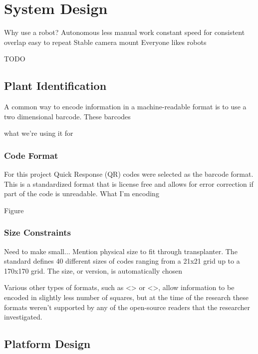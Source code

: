 
\cleardoublepage

\chapter{System Design}
\label{system}

Why use a robot?
Autonomous
less manual work 
constant speed for consistent overlap
easy to repeat
Stable camera mount
Everyone likes robots

TODO

\section{Plant Identification}
\label{system-plantid}

A common way to encode information in a machine-readable format is to use a two dimensional barcode.  These barcodes 

what we're using it for


\subsection{Code Format}

For this project Quick Response (QR) codes were selected as the barcode format. This is a standardized format that is license free and allows for error correction if part of the code is unreadable.  What I'm encoding

Figure 

\subsection{Size Constraints}

Need to make small...  Mention physical size to fit through transplanter.
The standard defines 40 different sizes of codes ranging from a 21x21 grid up to a 170x170 grid.  The size, or version, is automatically chosen 

Various other types of formats, such as <> or <>, allow information to be encoded in slightly less number of squares, but at the time of the research these formats weren't supported by any of the open-source readers that the researcher investigated.  

\section{Platform Design}
\label{system-platform}

